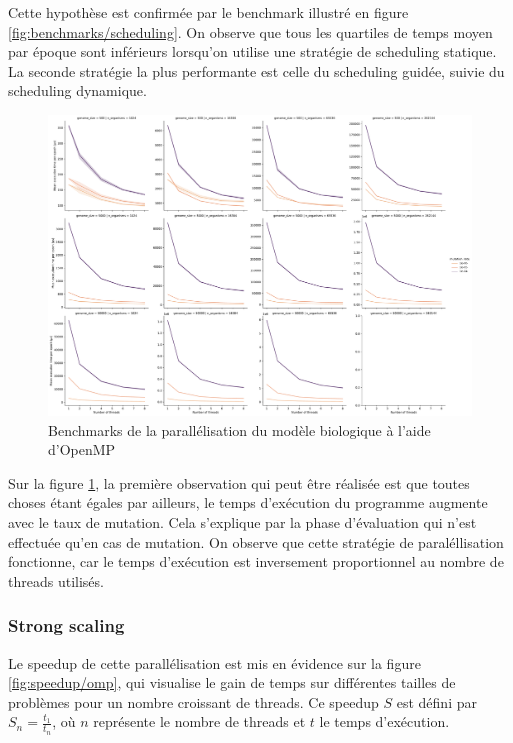 \documentclass[a4paper, 10pt, twoside]{article}
\begin{document}
Cette hypothèse est confirmée par le benchmark illustré en figure \ref{fig:benchmarks/scheduling}. On observe que tous les quartiles de temps moyen par époque sont inférieurs lorsqu'on utilise une stratégie de scheduling statique. La seconde stratégie la plus performante est celle du scheduling guidée, suivie du scheduling dynamique.

\begin{figure}[htb]
	\centering
	\includegraphics[width=0.7\linewidth]{img/benchmark_omp_static.pdf}
	\caption{Benchmarks de la parallélisation du modèle biologique à l'aide d'OpenMP}
	\label{fig:benchmarks/omp}
\end{figure}

Sur la figure \ref{fig:benchmarks/omp}, la première observation qui peut être réalisée est que toutes choses étant égales par ailleurs, le temps d'exécution du programme augmente avec le taux de mutation. Cela s'explique par la phase d'évaluation qui n'est effectuée qu'en cas de mutation. On observe que cette stratégie de paraléllisation fonctionne, car le temps d'exécution est inversement proportionnel au nombre de threads utilisés.

\subsubsection*{Strong scaling}

Le speedup de cette parallélisation est mis en évidence sur la figure \ref{fig:speedup/omp}, qui visualise le gain de temps sur différentes tailles de problèmes pour un nombre croissant de threads.
Ce speedup $S$ est défini par $ S_n = \frac{t_1}{t_n} $, où $n$ représente le nombre de threads et $t$ le temps d'exécution.
\end{document}
